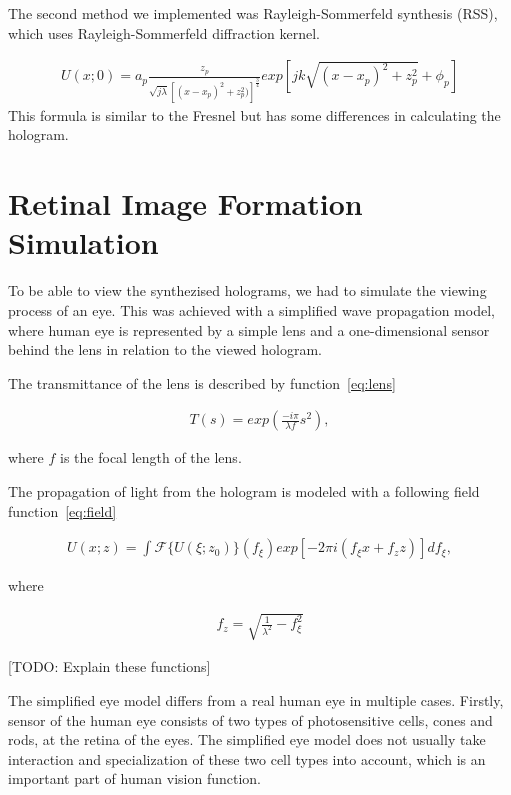\documentclass[12pt,a4paper,english
]{tunithesis}
\begin{document}
The second method we implemented was Rayleigh-Sommerfeld synthesis (RSS), which uses Rayleigh-Sommerfeld diffraction kernel. 

\begin{align}
  \label{eq:rss}
  U(x;0) = a_p\frac{z_p}{\sqrt{j \lambda}[(x-x_p)^2+z_p^2)]^\frac{3}{4}}exp[jk\sqrt{(x-x_p)^2+z_p^2}+\phi_p]
\end{align}
This formula is similar to the Fresnel but has some differences in calculating the hologram. 

\section{Retinal Image Formation Simulation}
To be able to view the synthezised holograms, we had to simulate the viewing process of an eye. This was achieved with a simplified wave propagation model, where human eye is represented by a simple lens and a one-dimensional sensor behind the lens in relation to the viewed hologram.

The transmittance of the lens is described by function~\ref{eq:lens}

\begin{align}
  \label{eq:lens}
  T(s) = exp(\frac{-i\pi}{\lambda f}s^2),
\end{align}

where $f$ is the focal length of the lens.

The propagation of light from the hologram is modeled with a following field function~\ref{eq:field}

\begin{align}
  \label{eq:field}
  U(x;z) = \int \mathscr{F} \{U (\xi;z_0) \} (f_\xi) exp[-2 \pi i (f_\xi x + f_z z)] d f_\xi,
\end{align}

where

\begin{align}
  \label{eq:focus}
  f_z = \sqrt{\frac{1}{\lambda^2} - f_\xi ^ 2}
\end{align}

[TODO: Explain these functions]

The simplified eye model differs from a real human eye in multiple cases. Firstly, sensor of the human eye consists of two types of photosensitive cells, cones and rods, at the retina of the eyes. The simplified eye model does not usually take interaction and specialization of these two cell types into account, which is an important part of human vision function.
\end{document}

